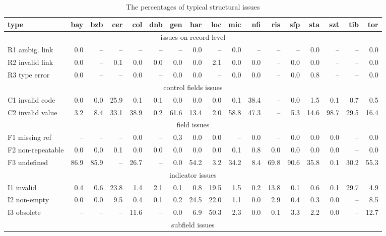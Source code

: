 \begin{table*}
\caption{The percentages of typical structural issues}
\label{tab:issue-types}
\begin{minipage}{17.5cm} %
\begin{center}
\begin{tabular}{lrrrrrrrrrrrrrrrr}
\toprule
type & bay & bzb & cer & col & dnb & gen & har & loc & mic & nfi & ris & sfp & sta & szt & tib & tor \\
\midrule
\multicolumn{17}{c}{issues on record level} \\
R1 ambig. link & 0.0 & -- & -- & -- & -- & -- & 0.0 & -- & 0.0 & -- & -- & -- & 0.0 & -- & -- & 0.0 \\
R2 invalid link & 0.0 & -- & 0.1 & 0.0 & 0.0 & 0.0 & 0.0 & 2.1 & 0.0 & 0.0 & -- & 0.0 & 0.0 & -- & -- & 0.0 \\
R3 type error & 0.0 & -- & -- & 0.0 & -- & 0.0 & 0.0 & -- & 0.0 & 0.0 & -- & 0.0 & 0.8 & -- & -- & 0.0 \\
\multicolumn{17}{c}{control fields issues} \\
C1 invalid code & 0.0 & 0.0 & 25.9 & 0.1 & 0.1 & 0.0 & 0.0 & 0.0 & 0.1 & 38.4 & -- & 0.0 & 1.5 & 0.1 & 0.7 & 0.5 \\
C2 invalid value & 3.2 & 8.4 & 33.1 & 38.9 & 0.2 & 61.6 & 13.4 & 2.0 & 58.8 & 47.3 & -- & 5.3 & 14.6 & 98.7 & 29.5 & 16.4 \\
\multicolumn{17}{c}{field issues} \\
F1 missing ref & -- & -- & -- & 0.0 & -- & 0.3 & 0.0 & 0.0 & -- & 0.0 & -- & 0.0 & 0.0 & 0.0 & -- & 0.0 \\
F2 non-repeatable & 0.0 & 0.0 & 0.1 & 0.0 & 0.0 & 0.0 & 0.0 & 0.0 & 0.1 & 0.8 & 0.0 & 0.0 & 0.0 & 0.0 & -- & 0.0 \\
F3 undefined & 86.9 & 85.9 & -- & 26.7 & -- & 0.0 & 54.2 & 3.2 & 34.2 & 8.4 & 69.8 & 90.6 & 35.8 & 0.1 & 30.2 & 55.3 \\
\multicolumn{17}{c}{indicator issues} \\
I1 invalid & 0.4 & 0.6 & 23.8 & 1.4 & 2.1 & 0.1 & 0.8 & 19.5 & 1.5 & 0.2 & 13.8 & 0.1 & 0.6 & 0.1 & 29.7 & 4.9 \\
I2 non-empty & 0.0 & 0.0 & 9.5 & 0.4 & 0.1 & 0.2 & 24.5 & 22.0 & 1.1 & 0.0 & 2.9 & 0.4 & 0.3 & 0.0 & -- & 8.5 \\
I3 obsolete & -- & -- & -- & 11.6 & -- & 0.0 & 6.9 & 50.3 & 2.3 & 0.0 & 0.1 & 3.3 & 2.2 & 0.0 & -- & 12.7 \\
\multicolumn{17}{c}{subfield issues} \\

\end{tabular}
\end{center}
\end{minipage}
\end{table*}
